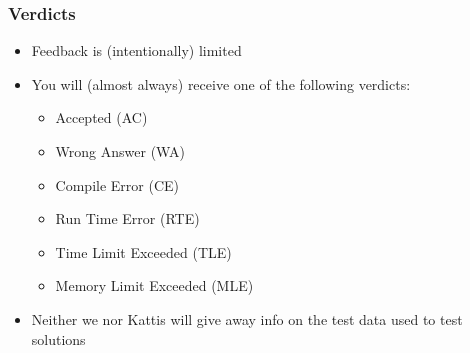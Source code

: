\documentclass{beamer}
\begin{document}
\begin{frame}[plain]
    \frametitle{Verdicts}
    \begin{itemize}
        \item Feedback is (intentionally) limited
        \item You will (almost always) receive one of the following verdicts:
        \begin{itemize}
            \item Accepted (AC)
            \item Wrong Answer (WA)
            \item Compile Error (CE)
            \item Run Time Error (RTE)
            \item Time Limit Exceeded (TLE)
            \item Memory Limit Exceeded (MLE)
        \end{itemize}
        \item Neither we nor Kattis will give away info on the test data used to test solutions
    \end{itemize}
\end{frame}
\end{document}
